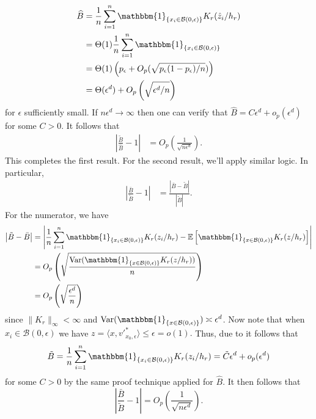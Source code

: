 \documentclass[11pt]{article}
\begin{document}
\begin{align*}
\widehat{B} &= \frac{1}{n}\sum_{i = 1}^n\mathbbm{1}_{\{x_i \in \mathcal{B}(0, \epsilon)\}}K_r(\hat{z}_i/h_r) \\
&= \Theta(1)\frac{1}{n}\sum_{i = 1}^n\mathbbm{1}_{\{x_i \in \mathcal{B}(0, \epsilon)\}} \\
&= \Theta(1)\left(p_{\epsilon} + O_p(\sqrt{p_{\epsilon}(1-p_{\epsilon})/n})\right) \\
&= \Theta(\epsilon^d) + O_p\left(\sqrt{\epsilon^d/n}\right)
\end{align*}
for $\epsilon$ sufficiently small. If $n\epsilon^d \rightarrow \infty$ then one can verify that $\widehat{B} = C\epsilon^d + o_p(\epsilon^d)$ for some $C > 0$. It follows that 
\begin{align*}
    \left|\frac{\tilde{B}}{\widehat{B}} - 1\right| &= O_p\left(\frac{1}{\sqrt{n\epsilon^d}}\right).
\end{align*}
This completes the first result. For the second result, we'll apply similar logic. In particular,
\begin{align*}
    \left|\frac{\bar{B}}{\tilde{B}} - 1\right| &= \frac{\left|\bar{B} - \tilde{B}\right|}{\left|\tilde{B}\right|}.
\end{align*}
For the numerator, we have 
\begin{align*}
    \left|\tilde{B} - \bar{B}\right| &= \left|\frac{1}{n}\sum_{i = 1}^n\mathbbm{1}_{\{x_i \in \mathcal{B}(0, \epsilon)\}}K_r(z_i/h_r) - \mathbb{E}\left[\mathbbm{1}_{\{x \in \mathcal{B}(0, \epsilon)\}}K_r(z/h_r)\right]\right| \\
    &= O_p\left(\sqrt{\frac{\text{Var}(\mathbbm{1}_{\{x \in \mathcal{B}(0, \epsilon)\}}K_r(z/h_r))}{n}}\right) \\
    &= O_p\left(\sqrt{\frac{\epsilon^d}{n}}\right)
\end{align*}
since $\|K_r\|_{\infty} < \infty$ and $\text{Var}(\mathbbm{1}_{\{x \in \mathcal{B}(0, \epsilon)\}}) \asymp \epsilon^d$. Now note that
when $x_i \in \mathcal{B}(0, \epsilon)$ we have $z = \langle x, v'^*_{x_0, \epsilon}\rangle \leq \epsilon = o(1).$ Thus, due to  it follows that 
\[\tilde{B} = \frac{1}{n}\sum_{i = 1}^n\mathbbm{1}_{\{x_i \in \mathcal{B}(0, \epsilon)\}}K_r(z_i/h_r) =  \tilde C\epsilon^d + o_p(\epsilon^d)\]
for some $C > 0$ by the same proof technique applied for $\widehat{B}$. It then follows that 
\begin{equation*}
    \left|\frac{\bar{B}}{\tilde{B}} - 1\right| = O_p\left(\frac{1}{\sqrt{n\epsilon^d}}\right).
\end{equation*}
\end{document}

